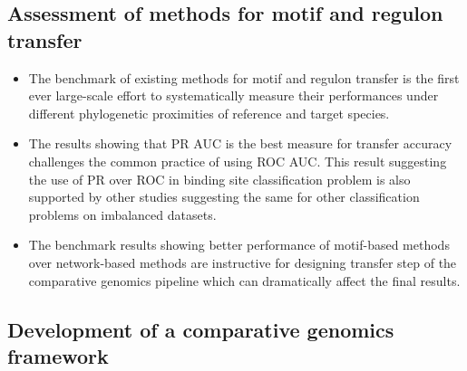 \documentclass[12pt]{article}
\begin{document}
\subsection{Assessment of methods for motif and regulon transfer}

\begin{itemize}
\item The benchmark of existing methods for motif and regulon transfer is the
  first ever large-scale effort to systematically measure their performances
  under different phylogenetic proximities of reference and target species.

\item The results showing that PR AUC is the best measure for transfer accuracy
  challenges the common practice of using ROC AUC\@. This result suggesting the
  use of PR over ROC in binding site classification problem is also supported
  by other studies suggesting the same for other classification problems on
  imbalanced datasets.

\item The benchmark results showing better performance of motif-based methods
  over network-based methods are instructive for designing transfer step of the
  comparative genomics pipeline which can dramatically affect the final results.
\end{itemize}

\subsection{Development of a comparative genomics framework}
\end{document}
